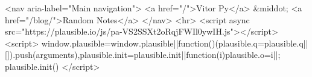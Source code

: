 \begin{rawhtml}
<nav aria-label="Main navigation">
  <a href="/">Vitor Py</a> &middot;
  <a href="/blog/">Random Notes</a>
</nav>
<hr>
<script async src="https://plausible.io/js/pa-VS2SSXt2oRqjFWIl0ywIH.js"></script>
<script>
  window.plausible=window.plausible||function(){(plausible.q=plausible.q||[]).push(arguments)},plausible.init=plausible.init||function(i){plausible.o=i||{}};
  plausible.init()
</script>
\end{rawhtml}
